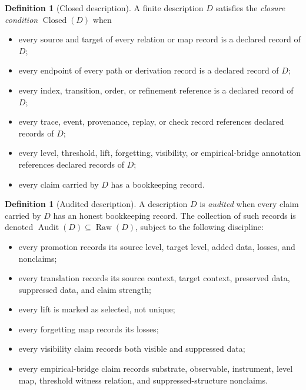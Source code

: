 \documentclass[11pt]{article}
\theoremstyle{definition}
\newtheorem{definition}[theorem]{Definition}
\newcommand{\Raw}[1]{\ensuremath{\operatorname{Raw}\!\left(#1\right)}}
\newcommand{\Audit}[1]{\ensuremath{\operatorname{Audit}\!\left(#1\right)}}
\newcommand{\Closed}[1]{\ensuremath{\operatorname{Closed}\!\left(#1\right)}}
\begin{document}
\begin{definition}[Closed description]\label{def:closed}
A finite description \(D\) satisfies the \emph{closure condition} \(\Closed{D}\)
when
\begin{itemize}[topsep=2pt,itemsep=1pt]
  \item every source and target of every relation or map record is a declared
    record of \(D\);
  \item every endpoint of every path or derivation record is a declared record
    of \(D\);
  \item every index, transition, order, or refinement reference is a declared
    record of \(D\);
  \item every trace, event, provenance, replay, or check record references
    declared records of \(D\);
  \item every level, threshold, lift, forgetting, visibility, or
    empirical-bridge annotation references declared records of \(D\);
  \item every claim carried by \(D\) has a bookkeeping record.
\end{itemize}
\end{definition}

\begin{definition}[Audited description]\label{def:audited}
A description \(D\) is \emph{audited} when every claim carried by \(D\) has an
honest bookkeeping record. The collection of such records is denoted
\(\Audit{D} \subseteq \Raw{D}\), subject to the following discipline:
\begin{itemize}[topsep=2pt,itemsep=1pt]
  \item every promotion records its source level, target level, added data,
    losses, and nonclaims;
  \item every translation records its source context, target context,
    preserved data, suppressed data, and claim strength;
  \item every lift is marked as selected, not unique;
  \item every forgetting map records its losses;
  \item every visibility claim records both visible and suppressed data;
  \item every empirical-bridge claim records substrate, observable,
    instrument, level map, threshold witness relation, and
    suppressed-structure nonclaims.
\end{itemize}
\end{definition}
\end{document}
